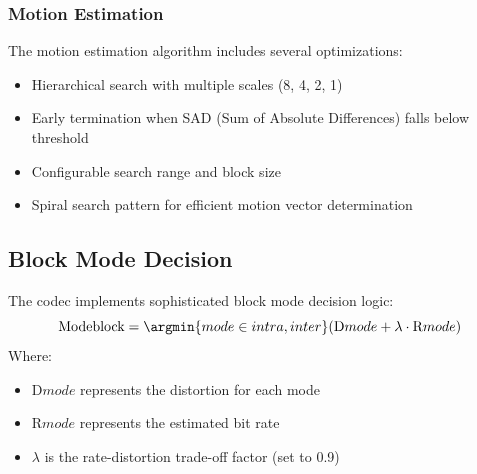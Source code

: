 \documentclass[a4paper,14pt]{article}
\begin{document}
\subsubsection{Motion Estimation}
The motion estimation algorithm includes several optimizations:
\begin{itemize}
\item Hierarchical search with multiple scales (8, 4, 2, 1)
\item Early termination when SAD (Sum of Absolute Differences) falls below threshold
\item Configurable search range and block size
\item Spiral search pattern for efficient motion vector determination
\end{itemize}
\subsection{Block Mode Decision}
The codec implements sophisticated block mode decision logic:
\begin{equation}
\text{Mode}{\text{block}} = \argmin{mode \in {intra,inter}} (\text{D}{mode} + \lambda \cdot \text{R}{mode})
\end{equation}
Where:
\begin{itemize}
\item $\text{D}{mode}$ represents the distortion for each mode
\item $\text{R}{mode}$ represents the estimated bit rate
\item $\lambda$ is the rate-distortion trade-off factor (set to 0.9)
\end{itemize}
\end{document}
